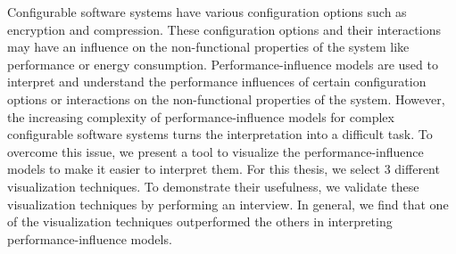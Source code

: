 
Configurable software systems have various configuration options such as encryption and compression. These configuration options and their interactions may have an influence on the non-functional properties of the system like performance or energy consumption. Performance-influence models are used to interpret and understand the performance influences of certain configuration options or interactions on the non-functional properties of the system. However, the increasing complexity of performance-influence models for complex configurable software systems turns the interpretation into a difficult task. To overcome this issue, we present a tool to visualize the performance-influence models to make it easier to interpret them. For this thesis, we select 3 different visualization techniques. To demonstrate their usefulness, we validate these visualization techniques by performing an interview. In general, we find that one of the visualization techniques outperformed the others in interpreting performance-influence models.